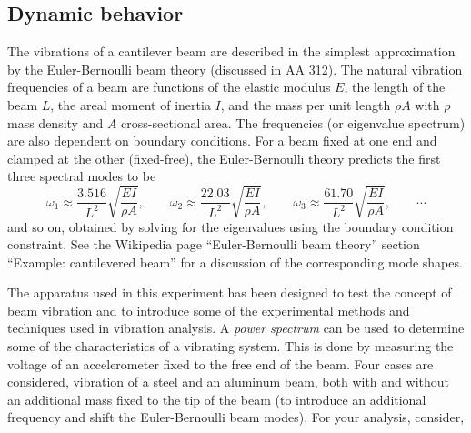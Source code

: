 \documentclass[12pt]{article}
\begin{document}
\subsection{Dynamic behavior}
The vibrations of a cantilever beam are described in the simplest approximation by the Euler-Bernoulli beam theory (discussed in AA 312). The natural vibration frequencies of a beam are functions of the elastic modulus $E$, the length of the beam $L$, the areal moment of inertia $I$, and the mass per unit length $\rho A$ with $\rho$ mass density and $A$ cross-sectional area. The frequencies (or eigenvalue spectrum) are also dependent on boundary conditions. For a beam fixed at one end and clamped at the other (fixed-free), the Euler-Bernoulli theory predicts the first three spectral modes to be
\begin{equation}
  \omega_1 \approx \frac{3.516}{L^2}\sqrt{\frac{EI}{\rho A}},\quad\quad \omega_2 \approx \frac{22.03}{L^2}\sqrt{\frac{EI}{\rho A}},\quad\quad \omega_3 \approx \frac{61.70}{L^2}\sqrt{\frac{EI}{\rho A}}, \quad\quad \cdots
\end{equation}
and so on, obtained by solving for the eigenvalues using the boundary condition constraint. See the Wikipedia page ``Euler-Bernoulli beam theory'' section ``Example: cantilevered beam'' for a discussion of the corresponding mode shapes.

The apparatus used in this experiment has been designed to test the concept of beam vibration and to introduce some of the experimental methods and techniques used in vibration analysis. A \textit{power spectrum} can be used to determine some of the characteristics of a vibrating system. This is done by measuring the voltage of an accelerometer fixed to the free end of the beam. Four cases are considered, vibration of a steel and an aluminum beam, both with and without an additional mass fixed to the tip of the beam (to introduce an additional frequency and shift the Euler-Bernoulli beam modes). For your analysis, consider,
\end{document}
